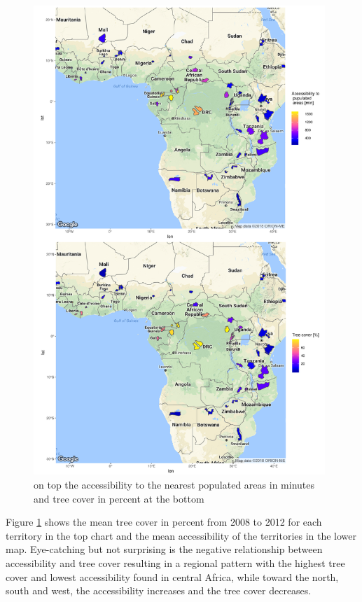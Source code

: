 \begin{center}
	\begin{figure}[h]
		\begin{center}
			\includegraphics[width=11cm]{images/sample_session_1-cropped.pdf}
			\caption{on top the accessibility to the nearest populated areas in minutes and tree cover in percent at the bottom}
			\label{sample_session_1}
		\end{center}
	\end{figure}
\end{center}


Figure \ref{sample_session_1} shows the mean tree cover in percent from 2008 to 2012 for each territory in the top chart and the mean accessibility of the territories in the lower map. Eye-catching but not surprising is the negative relationship between accessibility and tree cover resulting in a regional pattern with the highest tree cover and lowest accessibility found in central Africa, while toward the north, south and west, the accessibility increases and the tree cover decreases.

